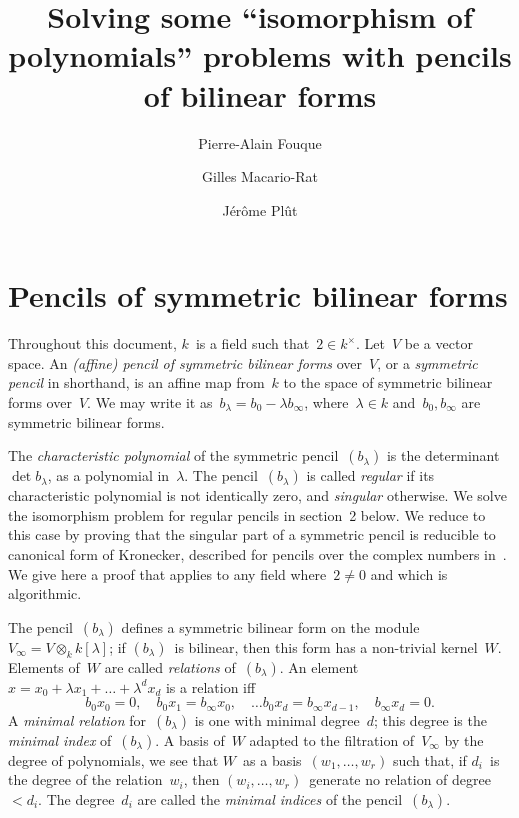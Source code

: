\documentclass{article}%
\begin{document}
\title{Solving some ``isomorphism of polynomials'' problems with pencils of
bilinear forms}
\author{Pierre-Alain Fouque \and Gilles Macario-Rat \and Jérôme Plût}
\maketitle

\section{Pencils of symmetric bilinear forms}%

Throughout this document, $k$~is a field such that~$2 ∈ k^{×}$. Let~$V$
be a vector space. An \emph{(affine) pencil of symmetric bilinear forms}
over~$V$, or a \emph{symmetric pencil} in shorthand, is an affine map
from~$k$ to the space of symmetric bilinear forms over~$V$. We may write
it as~$b_{λ} = b_{0} - λ b_{∞}$, where~$λ ∈ k$ and~$b_{0}, b_{∞}$ are
symmetric bilinear forms.

The \emph{characteristic polynomial} of the symmetric pencil~$(b_{λ})$ is
the determinant~$\det b_{λ}$, as a polynomial in~$λ$. The
pencil~$(b_{λ})$ is called \emph{regular} if its characteristic
polynomial is not identically zero, and \emph{singular} otherwise. We
solve the isomorphism problem for regular pencils in section 2 below. We
reduce to this case by proving that the singular part of a symmetric
pencil is reducible to canonical form of Kronecker, described for pencils
over the complex numbers in~\cite[XII(56)]{Gantmacher2}. We give here a
proof that applies to any field where~$2 ≠ 0$ and which is algorithmic.

\bigskip

The pencil~$(b_{λ})$ defines a symmetric bilinear form on the
module~$V_{∞} = V ⊗_{k} k[λ]$; if $(b_{λ})$~is bilinear, then this form
has a non-trivial kernel~$W$. Elements of~$W$ are called \emph{relations}
of~$(b_{λ})$. An element~$x = x_0 + λ x_1 + … + λ^d x_d$ is a
relation iff
\begin{equation}\label{eq:relation}
b_0 x_0 = 0, \quad
b_0 x_1 = b_{∞} x_0, \quad …
b_0 x_d = b_{∞} x_{d-1}, \quad
b_{∞} x_{d} = 0.
\end{equation}
A \emph{minimal relation} for~$(b_{λ})$ is one with minimal degree~$d$;
this degree is the \emph{minimal index} of~$(b_{λ})$. A basis
of~$W$ adapted to the filtration of~$V_{∞}$ by the degree of polynomials,
we see that $W$~as a basis~$(w_1,…,w_r)$ such that, if $d_i$~is the
degree of the relation~$w_i$, then $(w_i,…,w_r)$~generate no relation of
degree~$< d_i$. The degree~$d_i$ are called the \emph{minimal indices} of
the pencil~$(b_{λ})$.
\end{document}
